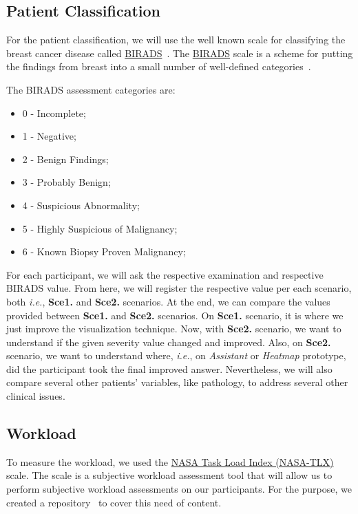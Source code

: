 \subsection{Patient Classification}

For the patient classification, we will use the well known scale for classifying the breast cancer disease called \hyperlink{https://en.wikipedia.org/wiki/BI-RADS}{BIRADS}~\cite{balleyguier2007birads}. The \hyperlink{https://en.wikipedia.org/wiki/BI-RADS}{BIRADS} scale is a scheme for putting the findings from breast into a small number of well-defined categories~\cite{obenauer2005applications}.

\hfil

The BIRADS assessment categories are:

\begin{itemize}
\item 0 - Incomplete;
\item 1 - Negative;
\item 2 - Benign Findings;
\item 3 - Probably Benign;
\item 4 - Suspicious Abnormality;
\item 5 - Highly Suspicious of Malignancy;
\item 6 - Known Biopsy Proven Malignancy;
\end{itemize}

For each participant, we will ask the respective examination and respective BIRADS value. From here, we will register the respective value per each scenario, both {\it i.e.}, {\bf Sce1.} and {\bf Sce2.} scenarios. At the end, we can compare the values provided between {\bf Sce1.} and {\bf Sce2.} scenarios. On {\bf Sce1.} scenario, it is where we just improve the visualization technique. Now, with {\bf Sce2.} scenario, we want to understand if the given severity value changed and improved. Also, on {\bf Sce2.} scenario, we want to understand where, {\it i.e.}, on {\it Assistant} or {\it Heatmap} prototype, did the participant took the final improved answer. Nevertheless, we will also compare several other patients' variables, like pathology, to address several other clinical issues.

\subsection{Workload}

To measure the workload, we used the \hyperlink{https://en.wikipedia.org/wiki/NASA-TLX}{NASA Task Load Index (NASA-TLX)}~\cite{ramkumar2017using} scale. The scale is a subjective workload assessment tool that will allow us to perform subjective workload assessments on our participants. For the purpose, we created a repository~\cite{https://doi.org/10.13140/rg.2.2.25301.06883, francisco_maria_calisto_2018_1435044} to cover this need of content.

